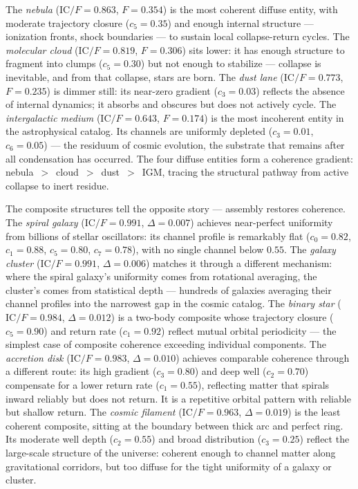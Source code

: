 \documentclass[
  aps,
  prd,
  twocolumn,
  superscriptaddress,
  nofootinbib,
  floatfix
]{revtex4-2}
\newcommand{\IC}{\mathrm{IC}}
\begin{document}
The \emph{nebula} ($\IC/F = 0.863$, $F = 0.354$) is the
most coherent diffuse entity, with moderate trajectory
closure ($c_5 = 0.35$) and enough internal structure ---
ionization fronts, shock boundaries --- to sustain local
collapse-return cycles.  The \emph{molecular cloud}
($\IC/F = 0.819$, $F = 0.306$) sits lower: it has enough
structure to fragment into clumps ($c_5 = 0.30$) but not
enough to stabilize --- collapse is inevitable, and from that
collapse, stars are born.  The \emph{dust lane}
($\IC/F = 0.773$, $F = 0.235$) is dimmer still: its
near-zero gradient ($c_3 = 0.03$) reflects the absence of
internal dynamics; it absorbs and obscures but does not
actively cycle.  The \emph{intergalactic medium}
($\IC/F = 0.643$, $F = 0.174$) is the most incoherent
entity in the astrophysical catalog.  Its channels are
uniformly depleted ($c_3 = 0.01$, $c_6 = 0.05$) --- the
residuum of cosmic evolution, the substrate that remains
after all condensation has occurred.
The four diffuse entities form a coherence gradient:
nebula~$>$~cloud~$>$~dust~$>$~IGM, tracing the
structural pathway from active collapse to inert residue.

The composite structures tell the opposite story ---
assembly restores coherence.  The \emph{spiral galaxy}
($\IC/F = 0.991$, $\Delta = 0.007$) achieves near-perfect
uniformity from billions of stellar oscillators: its
channel profile is remarkably flat ($c_0 = 0.82$,
$c_1 = 0.88$, $c_5 = 0.80$, $c_7 = 0.78$), with no single
channel below $0.55$.  The \emph{galaxy cluster}
($\IC/F = 0.991$, $\Delta = 0.006$) matches it through a
different mechanism: where the spiral galaxy's uniformity
comes from rotational averaging, the cluster's comes from
statistical depth --- hundreds of galaxies averaging their
channel profiles into the narrowest gap in the cosmic
catalog.
The \emph{binary star} ($\IC/F = 0.984$, $\Delta = 0.012$)
is a two-body composite whose trajectory closure
($c_5 = 0.90$) and return rate ($c_1 = 0.92$) reflect
mutual orbital periodicity --- the simplest case of
composite coherence exceeding individual components.
The \emph{accretion disk} ($\IC/F = 0.983$,
$\Delta = 0.010$) achieves comparable coherence through
a different route: its high gradient ($c_3 = 0.80$)
and deep well ($c_2 = 0.70$) compensate for a lower
return rate ($c_1 = 0.55$), reflecting matter that spirals
inward reliably but does not return.  It is a repetitive
orbital pattern with reliable but shallow return.
The \emph{cosmic filament} ($\IC/F = 0.963$,
$\Delta = 0.019$) is the least coherent composite, sitting
at the boundary between thick arc and perfect ring.  Its
moderate well depth ($c_2 = 0.55$) and broad distribution
($c_3 = 0.25$) reflect the large-scale structure of the
universe: coherent enough to channel matter along
gravitational corridors, but too diffuse for the tight
uniformity of a galaxy or cluster.
\end{document}
